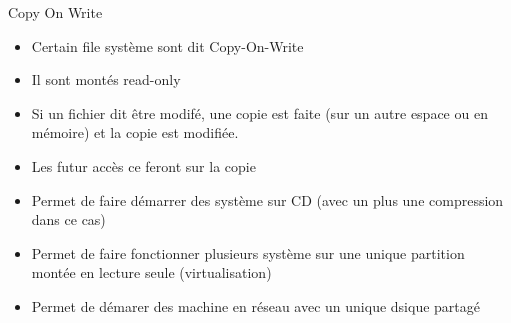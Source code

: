 \begin{frame}[fragile=singleslide]{Copy On Write}
  \begin{itemize}
  \item Certain file système sont dit Copy-On-Write
  \item Il sont montés read-only
  \item Si  un fichier dit  être modifé, une  copie est faite  (sur un
    autre espace ou en mémoire) et la copie est modifiée.
  \item Les futur accès ce feront sur la copie
  \item Permet de faire démarrer des  système sur CD (avec un plus une
    compression dans ce cas)
  \item Permet  de faire fonctionner plusieurs système  sur une unique
    partition montée en lecture seule (virtualisation)
  \item Permet de démarer des  machine en réseau avec un unique dsique
    partagé
  \end{itemize}
\end{frame}
